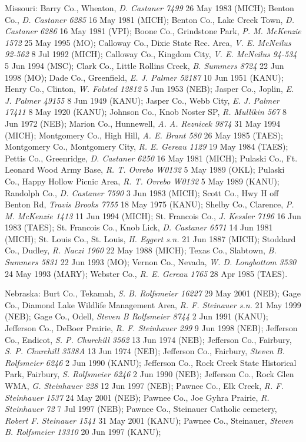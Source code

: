 \documentclass{article}
\begin{document}
Missouri:
Barry Co., Wheaton, \textit{D. Castaner 7499} 26 May 1983 (MICH); 
Benton Co., \textit{D. Castaner 6285} 16 May 1981 (MICH); 
Benton Co., Lake Creek Town, \textit{D. Castaner 6286} 16 May 1981 (VPI); 
Boone Co., Grindstone Park, \textit{P. M. McKenzie 1572} 25 May 1995 (MO); 
Calloway Co., Dixie State Rec. Area, \textit{V. E. McNeilus 92-562} 8 Jul 1992 (MICH); 
Calloway Co., Kingdom City, \textit{V. E. McNeilus 94-534} 5 Jun 1994 (MSC); 
Clark Co., Little Rollins Creek, \textit{B. Summers 8724} 22 Jun 1998 (MO); 
Dade Co., Greenfield, \textit{E. J. Palmer 52187} 10 Jun 1951 (KANU); 
Henry Co., Clinton, \textit{W. Folsted 12812} 5 Jun 1953 (NEB); 
Jasper Co., Joplin, \textit{E. J. Palmer 49155} 8 Jun 1949 (KANU); 
Jasper Co., Webb City, \textit{E. J. Palmer 17411} 8 May 1920 (KANU); 
Johnson Co., Knob Noster SP, \textit{R. Mullikin 567} 8 Jun 1972 (NEB); 
Marion Co., Hunnewell, \textit{A. A. Reznicek 9874} 31 May 1994 (MICH); 
Montgomery Co., High Hill, \textit{A. E. Brant 580} 26 May 1985 (TAES); 
Montgomery Co., Montgomery City, \textit{R. E. Gereau 1129} 19 May 1984 (TAES); 
Pettis Co., Greenridge, \textit{D. Castaner 6250} 16 May 1981 (MICH); 
Pulaski Co., Ft. Leonard Wood Army Base, \textit{R. T. Ovrebo W0132} 5 May 1989 (OKL); 
Pulaski Co., Happy Hollow Picnic Area, \textit{R. T. Ovrebo W0132} 5 May 1989 (KANU); 
Randolph Co., \textit{D. Castaner 7590} 3 Jun 1983 (MICH); 
Scott Co., Hwy H off Benton Rd, \textit{Travis Brooks 7755} 18 May 1975 (KANU); 
Shelby Co., Clarence, \textit{P. M. McKenzie 1413} 11 Jun 1994 (MICH); 
St. Francois Co., \textit{J. Kessler 7196} 16 Jun 1983 (TAES); 
St. Francois Co., Knob Lick, \textit{D. Castaner 6571} 14 Jun 1981 (MICH); 
St. Louis Co., St. Louis, \textit{H. Eggert s.n.} 21 Jun 1887 (MICH); 
Stoddard Co., Dudley, \textit{R. Naczi 1960} 22 May 1988 (MICH); 
Texas Co., Slabtown, \textit{B. Summers 5831} 22 Jun 1993 (MO); 
Vernon Co., Nevada, \textit{W. D. Longbottom 3530} 24 May 1993 (MARY); 
Webster Co., \textit{R. E. Gereau 1765} 28 Apr 1985 (TAES). 

Nebraska:
Burt Co., Tekamah, \textit{S. B. Rolfsmeier 16227} 29 May 2001 (NEB); 
Gage Co., Diamond Lake Wildlife Management Area, \textit{R. F. Steinauer s.n.} 21 May 1999 (NEB); 
Gage Co., Odell, \textit{Steven B Rolfsmeier 8744} 2 Jun 1991 (KANU); 
Jefferson Co., DeBoer Prairie, \textit{R. F. Steinhauer 299} 9 Jun 1998 (NEB); 
Jefferson Co., Endicot, \textit{S. P. Churchill 3562} 13 Jun 1974 (NEB); 
Jefferson Co., Fairbury, \textit{S. P. Churchill 3538A} 13 Jun 1974 (NEB); 
Jefferson Co., Fairbury, \textit{Steven B. Rolfsmeier 6246} 2 Jun 1990 (KANU); 
Jefferson Co., Rock Creek State Historical Park, Fairbury, \textit{S. Rolfsmeier 6246} 2 Jun 1990 (NEB); 
Jefferson Co., Rock Glen WMA, \textit{G. Steinhauer 228} 12 Jun 1997 (NEB); 
Pawnee Co., Elk Creek, \textit{R. F. Steinhauer 1537} 24 May 2001 (NEB); 
Pawnee Co., Joe Gyhra Prairie, \textit{R. Steinhauer 72} 7 Jul 1997 (NEB); 
Pawnee Co., Steinauer Catholic cemetery, \textit{Robert F. Steinauer 1541} 31 May 2001 (KANU); 
Pawnee Co., Steinauer, \textit{Steven B. Rolfsmeier 13310} 20 Jun 1997 (KANU); 
\end{document}
